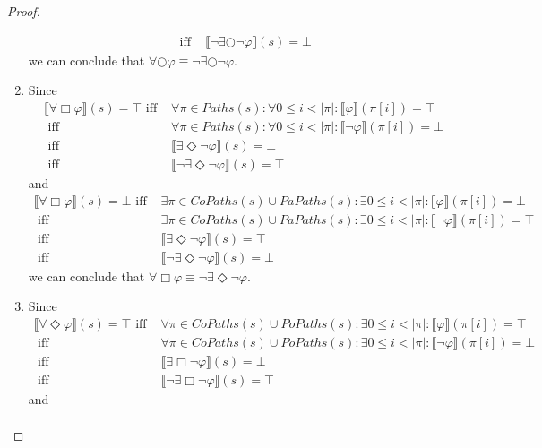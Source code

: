 \documentclass[12pt]{article}
\newcommand{\always}{\Box}
\newcommand{\eventually}{\Diamond}
\newcommand{\nxt}{\bigcirc}
\theoremstyle{definition}
\newcommand{\satisfaction}[1]{\llbracket #1 \rrbracket}
\newcommand{\bottom}{\mathord{\perp}}
\begin{document}
\begin{proof}
\begin{enumerate}
\begin{align*}
\mbox{ iff } & \satisfaction{\neg \exists \nxt \neg \varphi}(s) = \bottom
\end{align*}
we can conclude that $\forall \nxt \varphi \equiv \neg \exists \nxt \neg \varphi$.
\item
Since
\begin{align*}
\satisfaction{\forall \always \varphi}(s) = \top
\mbox{ iff } & \forall \pi \in \mathit{Paths}(s) : \forall 0 \leq i < |\pi| : \satisfaction{\varphi}(\pi[i]) = \top\\
\mbox{ iff } & \forall \pi \in \mathit{Paths}(s) : \forall 0 \leq i < |\pi| : \satisfaction{\neg \varphi}(\pi[i]) = \bottom\\
\mbox{ iff } & \satisfaction{\exists \eventually \neg \varphi}(s) = \bottom\\
\mbox{ iff } & \satisfaction{\neg \exists \eventually \neg \varphi}(s) = \top
\end{align*}
and
\begin{align*}
\satisfaction{\forall \always \varphi}(s) = \bottom
\mbox{ iff } & \exists \pi \in \mathit{CoPaths}(s) \cup \mathit{PaPaths}(s) : \exists 0 \leq i < |\pi| : \satisfaction{\varphi}(\pi[i]) = \bottom\\
\mbox{ iff } & \exists \pi \in \mathit{CoPaths}(s) \cup \mathit{PaPaths}(s) : \exists 0 \leq i < |\pi| : \satisfaction{\neg \varphi}(\pi[i]) = \top\\
\mbox{ iff } & \satisfaction{\exists \eventually \neg \varphi}(s) = \top\\
\mbox{ iff } & \satisfaction{\neg \exists \eventually \neg \varphi}(s) = \bottom
\end{align*}
we can conclude that $\forall \always \varphi \equiv \neg \exists \eventually \neg \varphi$.
\item
Since
\begin{align*}
\satisfaction{\forall \eventually \varphi}(s) = \top
\mbox{ iff } & \forall \pi \in \mathit{CoPaths}(s) \cup \mathit{PoPaths}(s) : \exists 0 \leq i < |\pi| : \satisfaction{\varphi}(\pi[i]) = \top\\
\mbox{ iff } & \forall \pi \in \mathit{CoPaths}(s) \cup \mathit{PoPaths}(s) : \exists 0 \leq i < |\pi| : \satisfaction{\neg \varphi}(\pi[i]) = \bottom\\
\mbox{ iff } & \satisfaction{\exists \always \neg \varphi}(s) = \bottom\\
\mbox{ iff } & \satisfaction{\neg \exists \always \neg \varphi}(s) = \top
\end{align*}
and
\begin{align*}

\end{align*}
\end{enumerate}
\end{proof}
\end{document}
